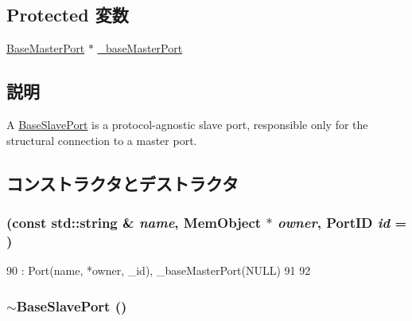 \subsection*{Protected 変数}
\begin{DoxyCompactItemize}
\item 
\hyperlink{classBaseMasterPort}{BaseMasterPort} $\ast$ \hyperlink{classBaseSlavePort_ad5f452d3408bb62d2df1e46d11070b9a}{\_\-baseMasterPort}
\end{DoxyCompactItemize}


\subsection{説明}
A \hyperlink{classBaseSlavePort}{BaseSlavePort} is a protocol-\/agnostic slave port, responsible only for the structural connection to a master port. 

\subsection{コンストラクタとデストラクタ}
\hypertarget{classBaseSlavePort_a414cdc348be270fd5d327495492317f3}{
\subsubsection[{BaseSlavePort}]{ (const std::string \& {\em name}, \/  {\bf MemObject} $\ast$ {\em owner}, \/  {\bf PortID} {\em id} = {})}}
\label{classBaseSlavePort_a414cdc348be270fd5d327495492317f3}



\begin{DoxyCode}
90     : Port(name, *owner, _id), _baseMasterPort(NULL)
91 {
92 }
\end{DoxyCode}
\hypertarget{classBaseSlavePort_af5de8ca1b8bfbd68a5fe3795a7b4d1ec}{
\subsubsection[{$\sim$BaseSlavePort}]{\setlength{\rightskip}{0pt plus 5cm}$\sim${\bf BaseSlavePort} ()}}
\label{classBaseSlavePort_af5de8ca1b8bfbd68a5fe3795a7b4d1ec}



